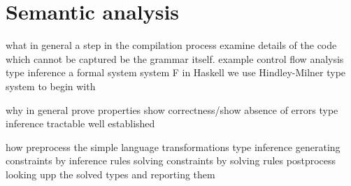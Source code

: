 \section{Semantic analysis}

what
  in general
    a step in the compilation process
    examine details of the code which cannot be captured be the grammar itself.
    example control flow analysis
  type inference
    a formal system
    system F in Haskell
    we use Hindley-Milner type system to begin with

why
  in general
    prove properties
    show correctness/show absence of errors
  type inference
    tractable
    well established

how
  preprocess
    the simple language
    transformations
  type inference
    generating constraints by inference rules
    solving constraints by solving rules
  postprocess
    looking upp the solved types and reporting them
